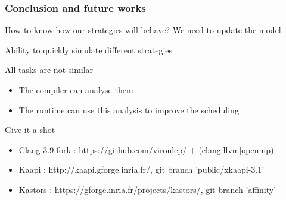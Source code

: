 \documentclass[xcolor={usenames,dvipsnames,svgnames,table}, aspectratio=43]{beamer}
\begin{document}
\begin{frame}[fragile]
  \frametitle{Conclusion and future works}

\begin{block}{How to know how our strategies will behave?}
  We need to update the model

  Ability to quickly simulate different strategies
\end{block}

\begin{block}{All tasks are not similar}
  \begin{itemize}
    \item The compiler can analyse them
    \item The runtime can use this analysis to improve the scheduling
  \end{itemize}
\end{block}

\begin{block}{Give it a shot}
  \begin{itemize}
    \item Clang 3.9 fork : https://github.com/viroulep/ + (clang|llvm|openmp)
    \item Kaapi : http://kaapi.gforge.inria.fr/, git branch 'public/xkaapi-3.1'
    \item Kastors : https://gforge.inria.fr/projects/kastors/, git branch 'affinity'
  \end{itemize}
\end{block}

\end{frame}



\end{document}
